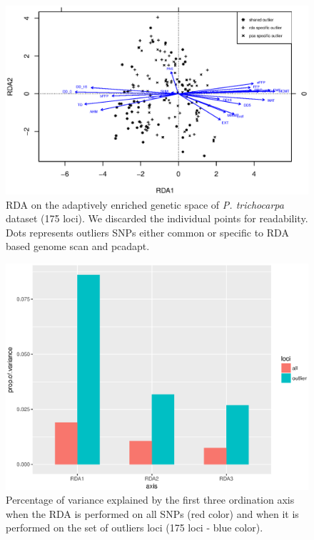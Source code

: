 \documentclass[a4paper,times,10pt,authoryear]{article}%
\begin{document}
\begin{figure}[t]
\begin{center}
\includegraphics[height=0.4\textheight]{figures/poplar_rda.eps}
\end{center}
\caption{RDA on the adaptively enriched genetic space of \textit{P. trichocarpa} dataset (175 loci). We discarded the individual points for readability. Dots represents outliers SNPs either common or specific to RDA based genome scan and pcadapt.}%
\label{fig:poplar_rda}%
\end{figure}

\begin{figure}[t]
\begin{center}
\includegraphics[height=0.4\textheight]{figures/varexplainedPopulus.eps}
\end{center}
\caption{Percentage of variance explained by the first three ordination axis when the RDA is performed on all SNPs (red color) and when it is performed on the set of outliers loci (175 loci - blue color).}%
\label{fig:varexplainedPopulus}%
\end{figure}
\end{document}
